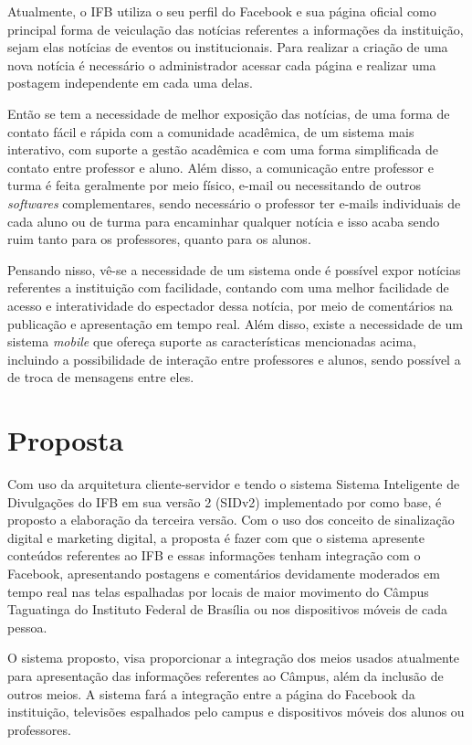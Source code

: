 Atualmente, o IFB utiliza o seu perfil do Facebook e sua página oficial como principal forma de veiculação das notícias referentes a informações da instituição, sejam elas notícias de eventos ou institucionais. Para realizar a criação de uma nova notícia é necessário o administrador acessar cada página e realizar uma postagem independente em cada uma delas. 

Então se tem a necessidade de melhor exposição das notícias, de uma forma de contato fácil e rápida com a comunidade acadêmica, de um sistema mais interativo, com suporte a gestão acadêmica e com uma forma simplificada de contato entre professor e aluno. Além disso, a comunicação entre professor e turma é feita geralmente por meio físico, e-mail ou necessitando de outros \textit{softwares} complementares, sendo necessário o professor ter e-mails individuais de cada aluno ou de turma para encaminhar qualquer notícia e isso acaba sendo ruim tanto para os professores, quanto para os alunos. 

Pensando nisso, vê-se a necessidade de um sistema onde é possível expor notícias referentes a instituição com facilidade, contando com uma melhor facilidade de acesso e interatividade do espectador dessa notícia, por meio de comentários na publicação e apresentação em tempo real. Além disso, existe a necessidade de um sistema \textit{mobile} que ofereça suporte as características mencionadas acima, incluindo a possibilidade de interação entre professores e alunos, sendo possível a de troca de mensagens entre eles.

\section{Proposta}
Com uso da arquitetura cliente-servidor e tendo o sistema Sistema Inteligente de Divulgações do IFB em sua versão 2 (SIDv2) implementado por \cite{sobrinho2017} como base, é proposto a elaboração da terceira versão. Com o uso dos conceito de sinalização digital e marketing digital, a proposta é fazer com que o sistema apresente conteúdos referentes ao IFB e essas informações tenham integração com o Facebook, apresentando postagens e comentários devidamente moderados em tempo real nas telas espalhadas por locais de maior movimento do Câmpus Taguatinga do Instituto Federal de Brasília ou nos dispositivos móveis de cada pessoa. 

O sistema proposto, visa proporcionar a integração dos meios usados atualmente para apresentação das informações referentes ao Câmpus, além da inclusão de outros meios. A sistema fará a integração entre a página do Facebook da instituição, televisões espalhados pelo campus e dispositivos móveis dos alunos ou professores.

